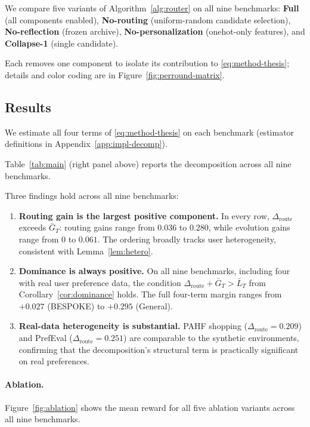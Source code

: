\documentclass{article} %
\begin{document}
We compare five variants of Algorithm~\ref{alg:router} on all nine benchmarks: \textbf{Full} (all components enabled), \textbf{No-routing} (uniform-random candidate selection), \textbf{No-reflection} (frozen archive), \textbf{No-personalization} (onehot-only features), and \textbf{Collapse-1} (single candidate).

Each removes one component to isolate its contribution to \eqref{eq:method-thesis}; details and color coding are in Figure~\ref{fig:perround-matrix}.

\subsection{Results}

\label{sec:exp-results}

We estimate all four terms of \eqref{eq:method-thesis} on each benchmark (estimator definitions in Appendix~\ref{app:impl-decomp}).

Table~\ref{tab:main} (right panel above) reports the decomposition across all nine benchmarks.

Three findings hold across all nine benchmarks:

\begin{enumerate}
\item \textbf{Routing gain is the largest positive component.} In every row, $\Delta_{\mathrm{route}}$ exceeds $\bar G_T$: routing gains range from $0.036$ to $0.280$, while evolution gains range from $0$ to $0.061$. The ordering broadly tracks user heterogeneity, consistent with Lemma~\ref{lem:hetero}.
\item \textbf{Dominance is always positive.} On all nine benchmarks, including four with real user preference data, the condition $\Delta_{\mathrm{route}}+\bar G_T>\bar L_T$ from Corollary~\ref{cor:dominance} holds. The full four-term margin ranges from $+0.027$ (BESPOKE) to $+0.295$ (General).
\item \textbf{Real-data heterogeneity is substantial.} PAHF shopping ($\Delta_{\mathrm{route}}{=}0.209$) and PrefEval ($\Delta_{\mathrm{route}}{=}0.251$) are comparable to the synthetic environments, confirming that the decomposition's structural term is practically significant on real preferences.
\end{enumerate}

\paragraph{Ablation.} Figure~\ref{fig:ablation} shows the mean reward for all five ablation variants across all nine benchmarks.
\end{document}
